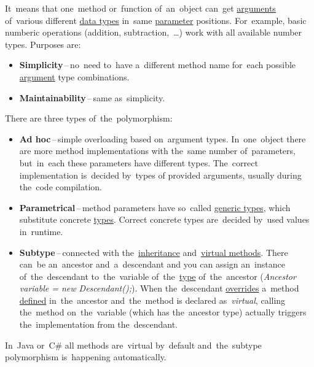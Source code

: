 \label{polymorphism}
It~means that one~method or~function of~an~object can~get \hyperref[parameterargument]{arguments} of~various different \hyperref[datatypes]{data types} in~same \hyperref[parameterargument]{parameter} positions. For~example, basic numberic operations (addition, subtraction,~\dots) work with all available number types. Purposes are:
\begin{itemize}
    \item \textbf{Simplicity}\,--\,no~need to~have a~different method name for~each possible \hyperref[parameterargument]{argument} type combinations.
    \item \textbf{Maintainability}\,--\,same as~simplicity.
\end{itemize}

\noindent There are three types of~the~polymorphism:
\begin{itemize}
    \item \textbf{Ad hoc}\,--\,simple overloading based on~argument types. In~one~object there are more method implementations with the~same number of~parameters, but~in~each these parameters have different types. The~correct implementation is~decided by~types of provided arguments, usually during the~code compilation.
    \item \textbf{Parametrical}\,--\,method parameters have so~called \hyperref[javagenerics]{generic types}, which substitute concrete \hyperref[datatypes]{types}. Correct concrete types are~decided by~used values in~runtime.
    \item \textbf{Subtype}\,--\,connected with the~\hyperref[inheritance]{inheritance} and~\hyperref[javavirtualmethods]{virtual methods}. There can~be an~ancestor and~a~descendant and you can assign an~instance of~the~descendant to~the~variable of~the~\hyperref[datatype]{type} of~the~ancestor (\textit{Ancestor variable = new Descendant();}). When the~descendant \hyperref[javaoverride]{overrides} a~method \hyperref[declarationdefinition]{defined} in~the~ancestor and~the~method is declared as~\textit{virtual}, calling the~method on~the~variable (which has the~ancestor type) actually triggers the~implementation from the~descendant.
\end{itemize}

\warning In~Java or~C\# all methods are~virtual by~default and~the~subtype polymorphism is~happening automatically.

